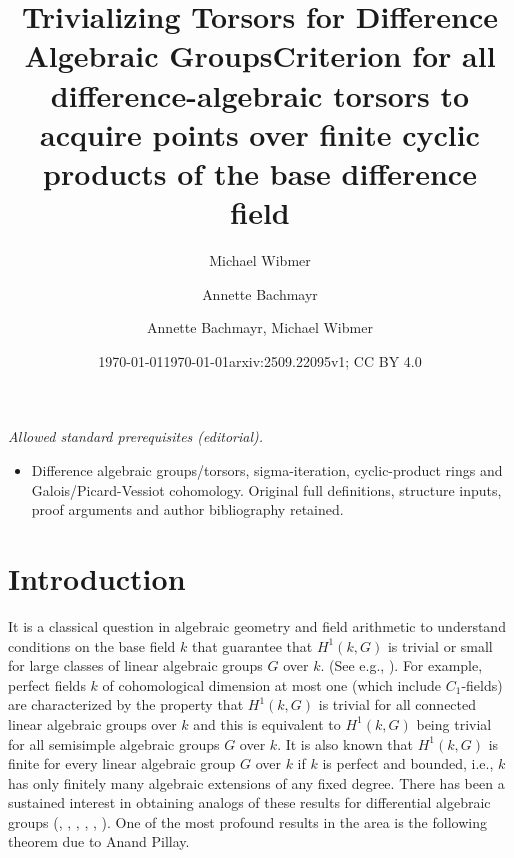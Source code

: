 \documentclass[oneside,reqno]{amsart}
\title{Trivializing Torsors for Difference Algebraic Groups}
\date{\today}
\author{Michael Wibmer}
\author{Annette Bachmayr}
\date{\today}
\title{Criterion for all difference-algebraic torsors to acquire points over finite cyclic products of the base difference field}
\author{Annette Bachmayr, Michael Wibmer}
\date{arxiv:2509.22095v1; CC BY 4.0}
\theoremstyle{definition}
\newcommand{\ab}[1]{\todo[inline,color=blue!20!white]{\textbf{Annette:} #1}}
\begin{document}
\maketitle
\noindent\textit{Allowed standard prerequisites (editorial).}\begin{itemize}
\item Difference algebraic groups/torsors, sigma-iteration, cyclic-product rings and Galois/Picard-Vessiot cohomology. Original full definitions, structure inputs, proof arguments and author bibliography retained.
\end{itemize}\medskip
\section{Introduction}

It is a classical question in algebraic geometry and field arithmetic to understand conditions on the base field $k$  that guarantee that $H^1(k,G)$ is trivial or small for large classes of linear algebraic groups $G$ over $k$. (See e.g., \cite{Serre:GaloisCohomology}). For example, perfect fields $k$ of cohomological dimension at most one (which include  $C_1$-fields) are characterized by the property that $H^1(k,G)$ is trivial for all connected linear algebraic groups over $k$ and this is equivalent to $H^1(k,G)$ being trivial for all semisimple algebraic groups $G$ over $k$. It is also known that $H^1(k,G)$ is finite for every linear algebraic group $G$ over $k$ if $k$ is perfect and bounded, i.e., $k$ has only finitely many algebraic extensions of any fixed degree. There has been a sustained interest in obtaining analogs of these results for differential algebraic groups (\cite{Pillay:ThePicardVessiotTheoryConstrainedCohomology}, \cite{MinchenkoOvchinnikov:TrivialityOfDifferentialGaloisCohomologyOfLinearDifferentialAlgebraicGroups}, \cite{ChatzidakisPillay:GeneralizedPVExtensionsAndDifferentialGaloisCohomology},
\cite{LeonSanchezPillay:DifferentialGaloisCohomologyAndParameterizedPicardVessiotExtensions}, \cite{LeonSanchezMeretzkyPillay:MoreOnGaloisCohomologyDefinabilityAndDifferentialAlgebraicGroups},  \cite{MeretzkyPillay:PicardVessiotExtensionsLinearDifferentialAlgebraicGroupsAndTheirTorsors}). One of the most profound results in the area is the following theorem due to Anand Pillay.
\end{document}
